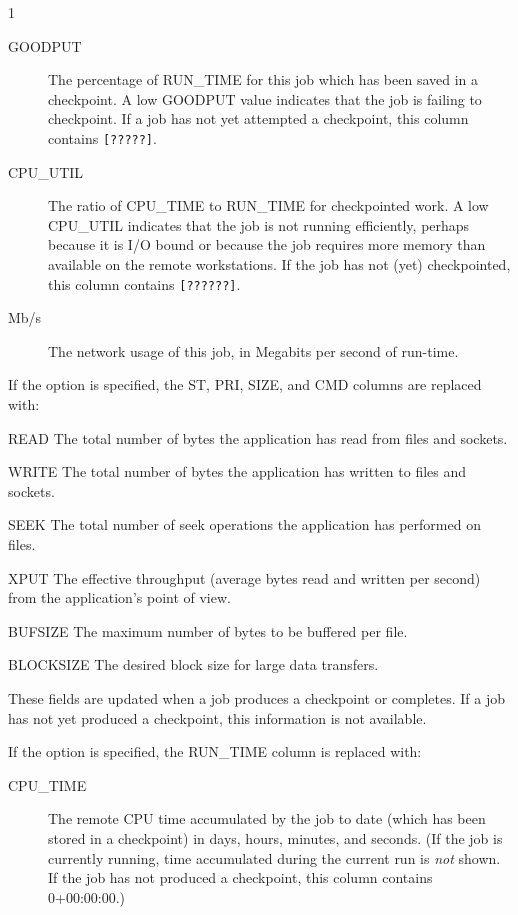 \begin{ManPage}{\label{man-condor-q}}{1}
\begin{description}
\item[GOODPUT] The percentage of RUN\_TIME for this job which has been
saved in a checkpoint.  A low GOODPUT value indicates that the job is
failing to checkpoint.  If a job has not yet attempted a checkpoint,
this column contains \texttt{[?????]}.
\item[CPU\_UTIL] The ratio of CPU\_TIME to RUN\_TIME for checkpointed
work.  A low CPU\_UTIL indicates that the job is not running
efficiently, perhaps because it is I/O bound or because the job
requires more memory than available on the remote workstations.  If
the job has not (yet) checkpointed, this column contains \texttt{[??????]}.
\item[Mb/s] The network usage of this job, in Megabits per second of
run-time.
\end{description}

If the  option is specified, the ST, PRI, SIZE, and CMD columns
are replaced with:

\begin{description}
\item{READ} The total number of bytes the application has read from files and sockets.
\item{WRITE} The total number of bytes the application has written to files and sockets.
\item{SEEK} The total number of seek operations the application has performed on files.
\item{XPUT} The effective throughput (average bytes read and written per second)
from the application's point of view.
\item{BUFSIZE} The maximum number of bytes to be buffered per file.
\item{BLOCKSIZE} The desired block size for large data transfers.
\end{description}

These fields are updated when a job produces a checkpoint or completes.
If a job
has not yet produced a checkpoint, this information is not available.

If the  option is specified, the RUN\_TIME 
column is replaced with:

\begin{description}
\item[CPU\_TIME] The remote CPU time accumulated by the job to date
(which has been stored in a checkpoint) in days, hours, minutes, and
seconds.  (If the job is currently running, time accumulated during
the current run is \emph{not} shown.  If the job has not produced a checkpoint,
this column contains 0+00:00:00.)
\end{description}


\end{ManPage}
